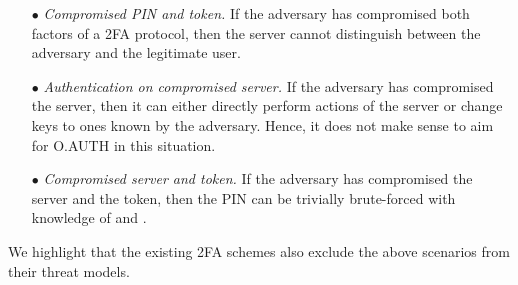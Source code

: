 \begin{itemize}[leftmargin=5.3mm]
\item[$\bullet$]\textit{Compromised PIN and token.}
If the adversary has compromised both factors of a 2FA protocol, then the server cannot distinguish between the adversary and the legitimate user.

\item[$\bullet$]\textit{Authentication on compromised server.}
If the adversary has compromised the server, then it can either directly perform actions of the server or change keys to ones known by the adversary. Hence, it does not make sense to aim for O.AUTH in this situation.

\item[$\bullet$]\textit{Compromised server and token.}
If the adversary has compromised the server and the token, then the PIN can be trivially brute-forced with knowledge of \VS{\verifier} and \VC{\salt}. %
\end{itemize}

We highlight that the existing 2FA schemes also exclude the above scenarios from their threat models. 
